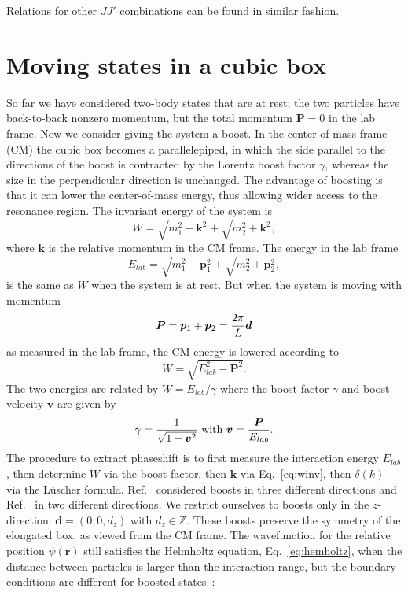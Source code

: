\documentclass[aps,prd,reprint,showpacs,floatfix,longbibliography,,superscriptaddress]{revtex4-1}
\def\beq{\begin{equation}}
\def\eeq{\end{equation}}
\begin{document}
\begin{widetext}
\begin{enumerate}[(i)]
\end{enumerate}
Relations for other $JJ'$ combinations can be found in similar fashion.



\section{Moving states in a cubic box}

So far we have considered two-body states that are at rest; 
the two particles have back-to-back nonzero momentum, but the total momentum $\bm P=0$ in the lab frame.
Now we consider giving the system a boost. 
In the center-of-mass frame (CM) the cubic box becomes a parallelepiped,
in which the side parallel to the directions of the boost is contracted by the Lorentz boost factor $\gamma$,
whereas the size in the perpendicular direction is unchanged.
The advantage of boosting is that it can lower the center-of-mass energy, thus allowing wider access to the resonance region.
The invariant energy of the system is
\beq W=\sqrt{m^2_1+\bm k^2}+\sqrt{m^2_2+\bm k^2}, \label{eq:winv}\eeq
 where $\bm k$ is the relative momentum in the CM frame.
The energy in the lab frame 
\beq E_{lab}=\sqrt{m^2_1+\bm p^2_1}+\sqrt{m^2_2+\bm p^2_2},  \label{eq:elab} \eeq
is the same as $W$ when the system is at rest.
But when the system is moving with momentum 
\beq \bm P=\bm p_1 + \bm p_2={2\pi \over L} \bm d \eeq
as measured in the lab frame,
the CM energy is lowered according to
\beq
W=\sqrt{E_{lab}^2-\bm P^2}.
\eeq
The two energies are related by $W=E_{lab}/\gamma$ where the boost factor $\gamma$ and boost velocity 
$\bm v$ are given by
\beq \gamma={1\over \sqrt{1-\bm v^2}} \text{  with  } \bm v = {\bm P \over E_{lab}}.  \label{eq:gamv} \eeq
The procedure to extract phaseshift is to first measure the interaction energy $E_{lab}$, then determine $W$ via the boost factor, 
then $\bm k$ via Eq.~\ref{eq:winv}, then $\delta(k)$ via the L\"{u}scher formula.
Ref.~\cite{Gockeler:2012yj} considered boosts in three different directions and Ref.~\cite{Leskovec:2012gb} in
two different directions. 
We restrict ourselves to boosts only in the $z$-direction: $\bm d=(0,0,d_z)$ with $d_z\in \mathds Z$.
These boosts preserve the symmetry of the elongated box, as viewed from the CM frame.
The wavefunction for the relative position $\psi(\bm r)$ still satisfies the Helmholtz equation,
Eq.~\ref{eq:hemholtz},
when the distance between particles is larger than the interaction range, but the
boundary conditions are different for boosted states~\cite{Rummukainen:1995vs,Fu:2011xz, Leskovec:2012gb,Gockeler:2012yj}:

\end{widetext}
\end{document}

